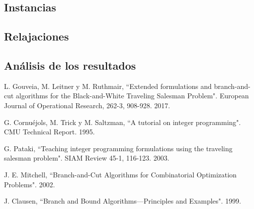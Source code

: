 \documentclass[10pt, a4paper]{article}
\theoremstyle{definition}
\begin{document}
\subsection{Instancias}

\subsection{Relajaciones}

\subsection{Análisis de los resultados}

\pagebreak

\begin{thebibliography}{9}

L. Gouveia, M. Leitner y M. Ruthmair, “Extended formulations and branch-and-cut algorithms for the Black-and-White Traveling Salesman Problem". European Journal of Operational Research, 262-3, 908-928. 2017.

G. Cornuéjols, M. Trick y M. Saltzman, “A tutorial on integer programming". CMU Technical Report. 1995.

G. Pataki, “Teaching integer programming formulations using the traveling salesman problem". SIAM Review 45-1, 116-123. 2003.

J. E. Mitchell, “Branch-and-Cut Algorithms for Combinatorial Optimization Problems". 2002.

J. Clausen, “Branch and Bound Algorithms—Principles and Examples". 1999.

\end{thebibliography}
\end{document}
